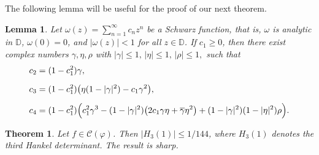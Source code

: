 \documentclass[a4paper,12pt,reqno]{amsart} %
\numberwithin{equation}{section}
\newtheorem{thm}{Theorem}[section]
\newtheorem{lem}{Lemma}[section]
\theoremstyle{definition}
\begin{document}
The following lemma \cite{ProkhorovSzynal1981} will be useful for the proof of our next theorem.
\begin{lem}\label{lemma3}
Let
$
\omega(z)=\sum_{n=1}^{\infty}c_n z^n
$
be a Schwarz function, that is, $\omega$ is analytic in $\mathbb D$,
$\omega(0)=0$, and $|\omega(z)|<1$ for all $z\in\mathbb D$.
If $c_1\ge 0$, then there exist complex numbers $\gamma,\eta,\rho$
with
$
|\gamma|\le 1,\, |\eta|\le 1,\, |\rho|\le 1,
$
such that
\begin{align*}
c_2 &= (1-c_1^2)\gamma,\\[2mm]
c_3 &= (1-c_1^2)\bigl(\eta(1-|\gamma|^2)-c_1\gamma^2\bigr),\\[2mm]
c_4 &= (1-c_1^2)\Bigl(
c_1^2\gamma^3
-(1-|\gamma|^2)\bigl(2c_1\gamma\eta+\overline{\gamma}\eta^2\bigr)
+(1-|\gamma|^2)(1-|\eta|^2)\rho
\Bigr).
\end{align*}
\end{lem}
\begin{thm}
Let $f\in \mathcal{C}(\varphi)$. Then $|H_3(1)|\leq {1}/{144}$, where $H_3(1)$ denotes the third Hankel determinant. The result is sharp.
\end{thm}
\end{document}
